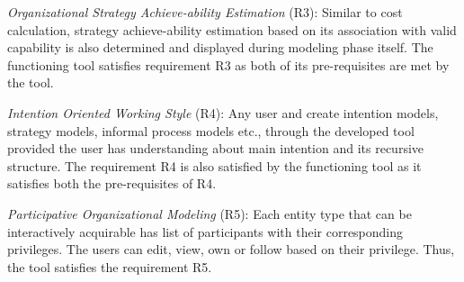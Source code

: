 \textit{Organizational Strategy Achieve-ability Estimation} (R3): Similar to cost calculation, strategy achieve-ability estimation based on its association with valid capability is also determined and displayed during modeling phase itself. The functioning tool satisfies requirement R3 as both of its pre-requisites are met by the tool.

\textit{Intention Oriented Working Style} (R4): Any user and create intention models, strategy models, informal process models etc., through the developed tool provided the user has understanding about main intention and its recursive structure. The requirement R4 is also satisfied by the functioning tool as it satisfies both the pre-requisites of R4.

\textit{Participative Organizational Modeling} (R5): Each entity type that can be interactively acquirable has list of participants with their corresponding privileges. The users can edit, view, own or follow based on their privilege. Thus, the tool satisfies the requirement R5.

